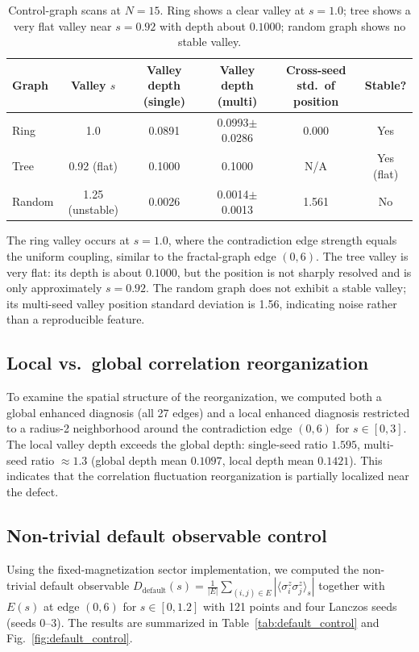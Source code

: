 \documentclass[aps,prb,reprint,superscriptaddress]{revtex4-2}
\begin{document}
\begin{table}[h]
\centering
\caption{Control-graph scans at $N=15$. Ring shows a clear valley at $s=1.0$; tree shows a very flat valley near $s=0.92$ with depth about $0.1000$; random graph shows no stable valley.}
\label{tab:control_graphs}
\begin{tabular}{lccccc}
\toprule
Graph & Valley $s$ & Valley depth (single) & Valley depth (multi) & Cross-seed std.\ of position & Stable? \\
\midrule
Ring & 1.0 & 0.0891 & 0.0993$\pm$0.0286 & 0.000 & Yes \\
Tree & 0.92 (flat) & 0.1000 & 0.1000 & N/A & Yes (flat) \\
Random & 1.25 (unstable) & 0.0026 & 0.0014$\pm$0.0013 & 1.561 & No \\
\bottomrule
\end{tabular}
\end{table}

The ring valley occurs at $s=1.0$, where the contradiction edge strength equals the uniform coupling, similar to the fractal-graph edge $(0,6)$. The tree valley is very flat: its depth is about $0.1000$, but the position is not sharply resolved and is only approximately $s=0.92$. The random graph does not exhibit a stable valley; its multi-seed valley position standard deviation is 1.56, indicating noise rather than a reproducible feature.

\subsection{Local vs.\ global correlation reorganization}
\label{sec:local_global}

To examine the spatial structure of the reorganization, we computed both a global enhanced diagnosis (all 27 edges) and a local enhanced diagnosis restricted to a radius-2 neighborhood around the contradiction edge $(0,6)$ for $s\in[0,3]$. The local valley depth exceeds the global depth: single-seed ratio $1.595$, multi-seed ratio $\approx1.3$ (global depth mean $0.1097$, local depth mean $0.1421$). This indicates that the correlation fluctuation reorganization is partially localized near the defect.

\subsection{Non-trivial default observable control}
\label{sec:default_control}

Using the fixed-magnetization sector implementation, we computed the non-trivial default observable $D_{\text{default}}(s)=\frac{1}{|E|}\sum_{(i,j)\in E}|\langle\sigma_i^z\sigma_j^z\rangle_s|$ together with $E(s)$ at edge $(0,6)$ for $s\in[0,1.2]$ with 121 points and four Lanczos seeds (seeds 0--3). The results are summarized in Table~\ref{tab:default_control} and Fig.~\ref{fig:default_control}.
\end{document}

